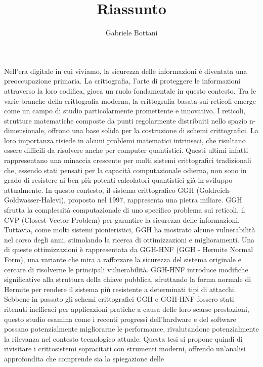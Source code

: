 \documentclass[a4paper,12pt]{article}
\title{Riassunto}
\author{Gabriele Bottani}
\begin{document}
\maketitle

Nell'era digitale in cui viviamo, la sicurezza delle informazioni è diventata una 
preoccupazione primaria. La crittografia, l'arte di proteggere le informazioni attraverso 
la loro codifica, gioca un ruolo fondamentale in questo contesto. Tra le varie branche 
della crittografia moderna, la crittografia basata sui reticoli emerge come un campo di 
studio particolarmente promettente e innovativo.
I reticoli, strutture matematiche composte da punti regolarmente distribuiti nello spazio 
n-dimensionale, offrono una base solida per la costruzione di schemi crittografici. La 
loro importanza risiede in alcuni problemi matematici intrinseci, che risultano 
essere difficili da risolvere anche per computer quantistici. Questi ultimi infatti 
rappresentano una minaccia crescente per molti sistemi crittografici tradizionali 
che, essendo stati pensati per la capacità computazionale odierna, non sono in grado di 
resistere ai ben più potenti calcolatori quantistici già in sviluppo attualmente. 
In questo contesto, il sistema crittografico GGH (Goldreich-Goldwasser-Halevi), 
proposto nel 1997, rappresenta una pietra miliare. GGH sfrutta la complessità 
computazionale di uno specifico problema sui reticoli, il CVP (Closest Vector Problem) 
per garantire la sicurezza delle informazioni. Tuttavia, come molti sistemi 
pionieristici, GGH ha mostrato alcune 
vulnerabilità nel corso degli anni, stimolando la ricerca di ottimizzazioni e 
miglioramenti. 
Una di queste ottimizzazioni è rappresentata da GGH-HNF (GGH - Hermite Normal Form), 
una variante che mira a rafforzare la sicurezza del sistema originale e cercare di risolverne 
le principali vulnerabilità. GGH-HNF introduce 
modifiche significative alla struttura della chiave pubblica, sfruttando la forma normale 
di Hermite per rendere il sistema più resistente a determinati tipi di attacchi.
Sebbene in passato gli schemi crittografici GGH e GGH-HNF fossero stati ritenuti inefficaci 
per applicazioni pratiche a causa delle loro scarse prestazioni,
questo studio esamina come i recenti progressi dell'hardware e del software possano potenzialmente 
migliorarne le performance, rivalutandone potenzialmente la rilevanza nel contesto 
tecnologico attuale. Questa tesi si propone quindi di rivisitare i crittosistemi sopracitati con 
strumenti moderni, offrendo un'analisi approfondita che comprende sia  la spiegazione delle 
\end{document}
